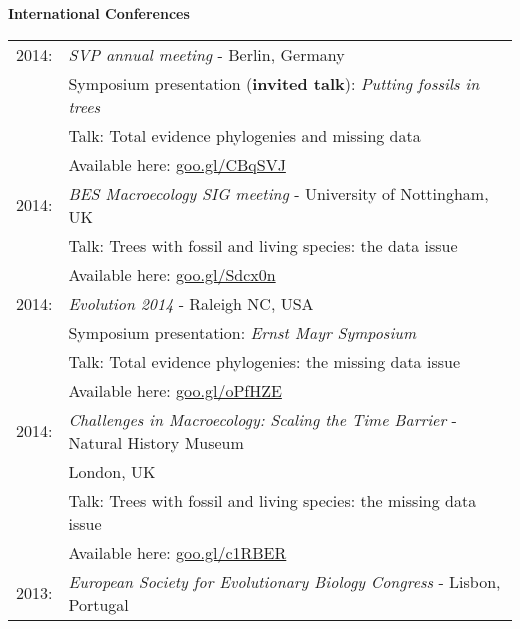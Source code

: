 \documentclass[10pt,a4paper]{article}
\begin{document}
{\raggedright\textbf{International Conferences}\\[1.5ex]
\begin{tabular}{ll}
2014: & \textit{SVP annual meeting} - Berlin, Germany\\
& Symposium presentation (\textbf{invited talk}): \textit{Putting fossils in trees}\\
& Talk: Total evidence phylogenies and missing data\\
& Available here: \href{http://figshare.com/articles/Total_evidence_phylogenies_the_missing_data_issue/1086216}{goo.gl/CBqSVJ}\\
2014: & \textit{BES Macroecology SIG meeting} - University of Nottingham, UK\\
& Talk: Trees with fossil and living species: the data issue\\ 
& Available here: \href{http://figshare.com/articles/Trees_with_fossil_and_living_species_the_data_issue/1056307}{goo.gl/Sdcx0n}\\
2014: & \textit{Evolution 2014} - Raleigh NC, USA\\
& Symposium presentation: \textit{Ernst Mayr Symposium} \\
& Talk: Total evidence phylogenies: the missing data issue\\
& Available here: \href{http://figshare.com/articles/Total_evidence_phylogenies_the_missing_data_issue/1086216}{goo.gl/oPfHZE}\\
2014: & \textit{Challenges in Macroecology: Scaling the Time Barrier} - Natural History Museum \\
& London, UK\\
& Talk: Trees with fossil and living species: the missing data issue\\
& Available here: \href{http://figshare.com/articles/Trees_with_fossil_and_living_species_the_data_issue/1056307}{goo.gl/c1RBER}\\
2013: & \textit{European Society for Evolutionary Biology Congress} - Lisbon, Portugal\\

\end{tabular}}
\end{document}
